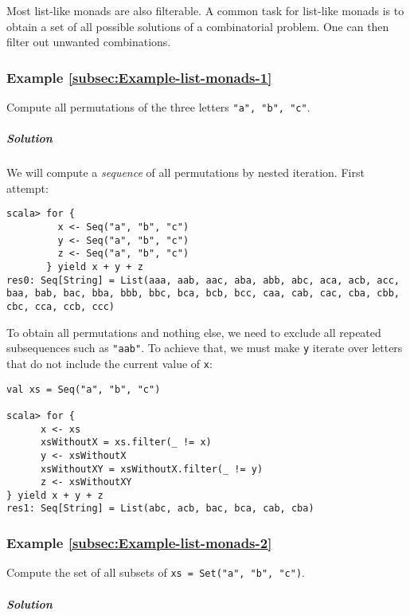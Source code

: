 Most list-like monads are also filterable. A common task for list-like
monads is to obtain a set of all possible solutions of a combinatorial
problem. One can then filter out unwanted combinations.

\subsubsection{Example \label{subsec:Example-list-monads-1}\ref{subsec:Example-list-monads-1}}

Compute all permutations of the three letters \lstinline!"a", "b", "c"!. 

\subparagraph{Solution}

We will compute a \emph{sequence} of all permutations by nested iteration.
First attempt:
\begin{lstlisting}
scala> for {
         x <- Seq("a", "b", "c")
         y <- Seq("a", "b", "c")
         z <- Seq("a", "b", "c")
       } yield x + y + z
res0: Seq[String] = List(aaa, aab, aac, aba, abb, abc, aca, acb, acc, baa, bab, bac, bba, bbb, bbc, bca, bcb, bcc, caa, cab, cac, cba, cbb, cbc, cca, ccb, ccc)
\end{lstlisting}
To obtain all permutations and nothing else, we need to exclude all
repeated subsequences such as \lstinline!"aab"!. To achieve that,
we must make \lstinline!y! iterate over letters that do not include
the current value of \lstinline!x!:
\begin{lstlisting}
val xs = Seq("a", "b", "c")

scala> for {
      x <- xs
      xsWithoutX = xs.filter(_ != x)
      y <- xsWithoutX
      xsWithoutXY = xsWithoutX.filter(_ != y)
      z <- xsWithoutXY
} yield x + y + z
res1: Seq[String] = List(abc, acb, bac, bca, cab, cba) 
\end{lstlisting}


\subsubsection{Example \label{subsec:Example-list-monads-2}\ref{subsec:Example-list-monads-2}}

Compute the set of all subsets of \lstinline!xs = Set("a", "b", "c")!. 

\subparagraph{Solution}

